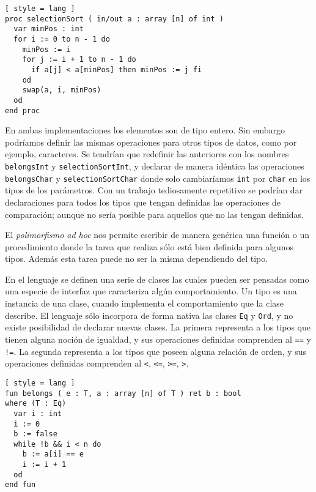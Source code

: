 \begin{lstlisting}[ style = lang ]
proc selectionSort ( in/out a : array [n] of int )
  var minPos : int
  for i := 0 to n - 1 do
    minPos := i
    for j := i + 1 to n - 1 do
      if a[j] < a[minPos] then minPos := j fi
    od
    swap(a, i, minPos)
  od
end proc
\end{lstlisting}

En ambas implementaciones los elementos son de tipo entero.
Sin embargo podríamos definir las mismas operaciones para otros tipos de datos, como por ejemplo, caracteres.
Se tendrían que redefinir las anteriores con los nombres \lstinline[style = lang]{belongsInt} y \lstinline[style = lang]{selectionSortInt}, y declarar de manera idéntica las operaciones \lstinline[style = lang]{belongsChar} y \lstinline[style = lang]{selectionSortChar} donde solo cambiaríamos \lstinline[style = lang]{int} por \lstinline[style = lang]{char} en los tipos de los parámetros.
Con un trabajo tediosamente repetitivo se podrían dar declaraciones para todos los tipos que tengan definidas las operaciones de comparación; aunque no sería posible para aquellos que no las tengan definidas.

El \textit{polimorfismo ad hoc} nos permite escribir de manera genérica una función o un procedimiento donde la tarea que realiza sólo está bien definida para algunos tipos.
Además esta tarea puede no ser la misma dependiendo del tipo.

En el lenguaje se definen una serie de clases las cuales pueden ser pensadas como una especie de interfaz que caracteriza algún comportamiento.
Un tipo es una instancia de una clase, cuando implementa el comportamiento que la clase describe.
El lenguaje sólo incorpora de forma nativa las clases \lstinline[style = lang]{Eq} y \lstinline[style = lang]{Ord}, y no existe posibilidad de declarar nuevas clases.
La primera representa a los tipos que tienen alguna noción de igualdad, y sus operaciones definidas comprenden al \lstinline[style = lang]{==} y \lstinline[style = lang]{!=}.
La segunda representa a los tipos que poseen alguna relación de orden, y sus operaciones definidas comprenden al \lstinline[style = lang]{<}, \lstinline[style = lang]{<=}, \lstinline[style = lang]{>=}, \lstinline[style = lang]{>}.

\begin{lstlisting}[ style = lang ]
fun belongs ( e : T, a : array [n] of T ) ret b : bool
where (T : Eq)
  var i : int
  i := 0
  b := false
  while !b && i < n do
    b := a[i] == e
    i := i + 1
  od
end fun
\end{lstlisting}

